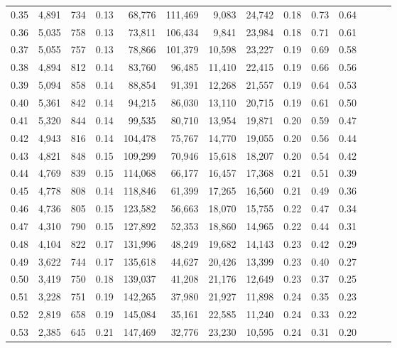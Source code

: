 \begin{tabular}{rrrrrrrrrrrrrr}
0.35 &  4,891 &  734 &  0.13 &   68,776 &  111,469 &   9,083 &  24,742 &  0.18 &  0.73 &      0.64 \\
0.36 &  5,035 &  758 &  0.13 &   73,811 &  106,434 &   9,841 &  23,984 &  0.18 &  0.71 &      0.61 \\
0.37 &  5,055 &  757 &  0.13 &   78,866 &  101,379 &  10,598 &  23,227 &  0.19 &  0.69 &      0.58 \\
0.38 &  4,894 &  812 &  0.14 &   83,760 &   96,485 &  11,410 &  22,415 &  0.19 &  0.66 &      0.56 \\
0.39 &  5,094 &  858 &  0.14 &   88,854 &   91,391 &  12,268 &  21,557 &  0.19 &  0.64 &      0.53 \\
0.40 &  5,361 &  842 &  0.14 &   94,215 &   86,030 &  13,110 &  20,715 &  0.19 &  0.61 &      0.50 \\
0.41 &  5,320 &  844 &  0.14 &   99,535 &   80,710 &  13,954 &  19,871 &  0.20 &  0.59 &      0.47 \\
0.42 &  4,943 &  816 &  0.14 &  104,478 &   75,767 &  14,770 &  19,055 &  0.20 &  0.56 &      0.44 \\
0.43 &  4,821 &  848 &  0.15 &  109,299 &   70,946 &  15,618 &  18,207 &  0.20 &  0.54 &      0.42 \\
0.44 &  4,769 &  839 &  0.15 &  114,068 &   66,177 &  16,457 &  17,368 &  0.21 &  0.51 &      0.39 \\
0.45 &  4,778 &  808 &  0.14 &  118,846 &   61,399 &  17,265 &  16,560 &  0.21 &  0.49 &      0.36 \\
0.46 &  4,736 &  805 &  0.15 &  123,582 &   56,663 &  18,070 &  15,755 &  0.22 &  0.47 &      0.34 \\
0.47 &  4,310 &  790 &  0.15 &  127,892 &   52,353 &  18,860 &  14,965 &  0.22 &  0.44 &      0.31 \\
0.48 &  4,104 &  822 &  0.17 &  131,996 &   48,249 &  19,682 &  14,143 &  0.23 &  0.42 &      0.29 \\
0.49 &  3,622 &  744 &  0.17 &  135,618 &   44,627 &  20,426 &  13,399 &  0.23 &  0.40 &      0.27 \\
0.50 &  3,419 &  750 &  0.18 &  139,037 &   41,208 &  21,176 &  12,649 &  0.23 &  0.37 &      0.25 \\
0.51 &  3,228 &  751 &  0.19 &  142,265 &   37,980 &  21,927 &  11,898 &  0.24 &  0.35 &      0.23 \\
0.52 &  2,819 &  658 &  0.19 &  145,084 &   35,161 &  22,585 &  11,240 &  0.24 &  0.33 &      0.22 \\
0.53 &  2,385 &  645 &  0.21 &  147,469 &   32,776 &  23,230 &  10,595 &  0.24 &  0.31 &      0.20 \\

\end{tabular}
